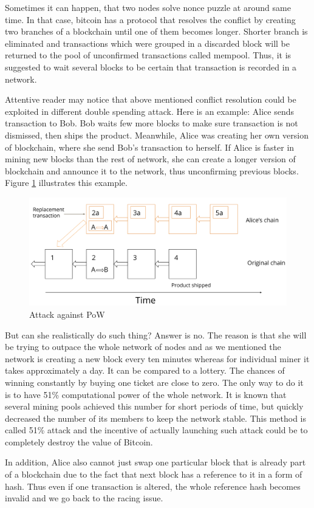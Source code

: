 \documentclass[conference,compsoc]{IEEEtran}
\begin{document}
Sometimes it can happen, that two nodes solve nonce puzzle at around same time. 
In that case, bitcoin has a protocol that resolves the conflict by creating two branches of a blockchain until one of them becomes longer.
Shorter branch is eliminated and transactions which were grouped in a discarded block will be returned to the pool of unconfirmed transactions called mempool.
Thus, it is suggested to wait several blocks to be certain that transaction is recorded in a network.

Attentive reader may notice that above mentioned conflict resolution could be exploited in different double spending attack. 
Here is an example: Alice sends transaction to Bob. 
Bob waits few more blocks to make sure transaction is not dismissed, then ships the product.
Meanwhile, Alice was creating her own version of blockchain, where she send Bob's transaction to herself. 
If Alice is faster in mining new blocks than the rest of network, she can create a longer version of blockchain and announce it to the network, thus unconfirming previous blocks.
Figure \ref{fig:fig4} illustrates this example.

\begin{figure}[h]
  \centering
  \includegraphics[width=.45\textwidth]{graphics/pow.png}
  \caption{Attack against PoW}
  \label{fig:fig4}
\end{figure}

But can she realistically do such thing? 
Answer is no.
The reason is that she will be trying to outpace the whole network of nodes and as we mentioned the network is creating a new block every ten minutes whereas for individual miner it takes approximately a day. 
It can be compared to a lottery. 
The chances of winning constantly by buying one ticket are close to zero. 
The only way to do it is to have 51\% computational power of the whole network.
It is known that several mining pools achieved this number for short periods of time, but quickly decreased the number of its members to keep the network stable.
This method is called 51\% attack and the incentive of actually launching such attack could be to completely destroy the value of Bitcoin. 

In addition, Alice also cannot just swap one particular block that is already part of a blockchain due to the fact that next block has a reference to it in a form of hash. 
Thus even if one transaction is altered, the whole reference hash becomes invalid and we go back to the racing issue.
\end{document}
